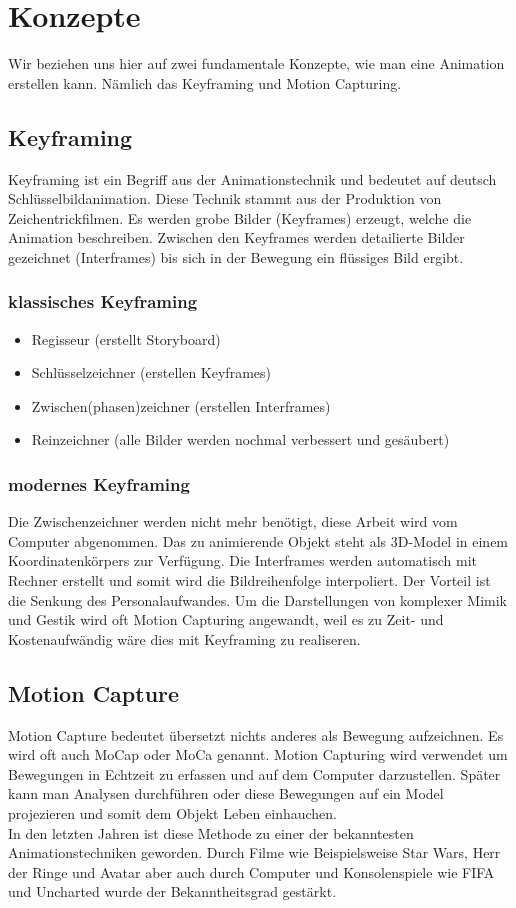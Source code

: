 \chapter{Konzepte}
Wir beziehen uns hier auf zwei fundamentale Konzepte, wie man eine Animation erstellen kann. Nämlich das Keyframing und Motion Capturing. 

\section{Keyframing}
Keyframing ist ein Begriff aus der Animationstechnik und bedeutet auf deutsch Schlüsselbildanimation. Diese Technik stammt aus der Produktion von Zeichentrickfilmen. Es werden grobe Bilder (Keyframes) erzeugt, welche die Animation beschreiben. Zwischen den Keyframes werden detailierte Bilder gezeichnet (Interframes) bis sich in der Bewegung ein flüssiges Bild ergibt.

\subsection{klassisches Keyframing}
\begin{itemize}
\item Regisseur (erstellt Storyboard)
\item Schlüsselzeichner (erstellen Keyframes)
\item Zwischen(phasen)zeichner (erstellen Interframes)
\item Reinzeichner (alle Bilder werden nochmal verbessert und gesäubert)
\end{itemize}

\subsection{modernes Keyframing}
Die Zwischenzeichner werden nicht mehr benötigt, diese Arbeit wird vom Computer abgenommen. Das zu animierende Objekt steht als 3D-Model in einem Koordinatenkörpers zur Verfügung. Die Interframes werden automatisch mit Rechner erstellt und somit wird die Bildreihenfolge interpoliert. Der Vorteil ist die Senkung des Personalaufwandes. Um die Darstellungen von komplexer Mimik und Gestik wird oft Motion Capturing angewandt, weil es zu Zeit- und Kostenaufwändig wäre dies mit Keyframing zu realiseren. 


\section{Motion Capture}
Motion Capture bedeutet übersetzt nichts anderes als Bewegung aufzeichnen. 
Es wird oft auch MoCap oder MoCa genannt. Motion Capturing wird verwendet 
um Bewegungen in Echtzeit zu erfassen und auf dem Computer darzustellen. 
Später kann man Analysen durchführen oder diese Bewegungen auf ein Model 
projezieren und somit dem Objekt Leben einhauchen. \\
In den letzten Jahren ist diese Methode zu einer der bekanntesten Animationstechniken geworden. 
Durch Filme wie Beispielsweise Star Wars, Herr der Ringe und Avatar aber 
auch durch Computer und Konsolenspiele wie FIFA und Uncharted  
wurde der Bekanntheitsgrad gestärkt.    

